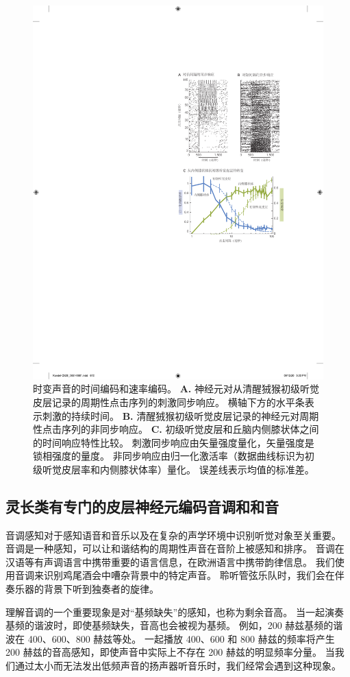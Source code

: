 \begin{figure}[htbp]
	\centering
	\includegraphics[width=0.6\linewidth]{chap28/fig_28_12}
	\caption{时变声音的时间编码和速率编码。
	\textbf{A.} 神经元对从清醒狨猴初级听觉皮层记录的周期性点击序列的刺激同步响应。
	横轴下方的水平条表示刺激的持续时间\cite{lu2001temporal}。
	\textbf{B.} 清醒狨猴初级听觉皮层记录的神经元对周期性点击序列的非同步响应\cite{lu2001temporal}。
	\textbf{C.} 初级听觉皮层和丘脑内侧膝状体之间的时间响应特性比较。
	刺激同步响应由矢量强度量化，矢量强度是锁相强度的量度。
	非同步响应由归一化激活率（数据曲线标识为初级听觉皮层率和内侧膝状体率）量化。
	误差线表示均值的标准差\cite{bartlett2007neural}。}
	\label{fig:28_12}
\end{figure}



\subsection{灵长类有专门的皮层神经元编码音调和和音}

音调感知对于感知语音和音乐以及在复杂的声学环境中识别听觉对象至关重要。
音调是一种感知，可以让和谐结构的周期性声音在音阶上被感知和排序。
音调在汉语等有声调语言中携带重要的语言信息，在欧洲语言中携带韵律信息。
我们使用音调来识别鸡尾酒会中嘈杂背景中的特定声音。
聆听管弦乐队时，我们会在伴奏乐器的背景下听到独奏者的旋律。


理解音调的一个重要现象是对“基频缺失”的感知，也称为剩余音高。
当一起演奏基频的谐波时，即使基频缺失，音高也会被视为基频。
例如，200 赫兹基频的谐波在 400、600、800 赫兹等处。
一起播放 400、600 和 800 赫兹的频率将产生 200 赫兹的音高感知，即使声音中实际上不存在 200 赫兹的明显频率分量。
当我们通过太小而无法发出低频声音的扬声器听音乐时，我们经常会遇到这种现象。


